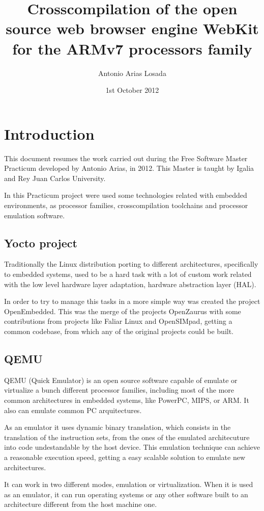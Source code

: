 \documentclass[a4paper,11pt,openany]{report}
\title{Crosscompilation of the open source web browser engine WebKit for the ARMv7 processors family}
\author{Antonio Arias Losada}
\date{1st October 2012}
\begin{document}
\maketitle
\tableofcontents
\listoffigures


\chapter{Introduction}
This document resumes the work carried out during the Free Software Master\cite{master} Practicum developed by Antonio Arias, in 2012. This Master is taught by Igalia and Rey Juan Carlos University.

In this Practicum project were used some technologies related with embedded environments, as processor families, crosscompilation toolchains and processor emulation software.

\section{Yocto project}
Traditionally the Linux distribution porting to different architectures, specifically to embedded systems, used to be a hard task with a lot of custom work related with the low level hardware layer adaptation, hardware abstraction layer (HAL).

In order to try to manage this tasks in a more simple way was created the project OpenEmbedded. This was  the merge of the projects OpenZaurus with some contributions from projects like Faliar Linux and OpenSIMpad, getting a common codebase, from which any of the original projects could be built.

\section{QEMU}
QEMU (Quick Emulator)\cite{qemu} is an open source software capable of emulate or virtualize a bunch different processor families, including most of the more common architectures in embedded systems, like PowerPC, MIPS, or ARM. It also can emulate common PC arquitectures.

As an emulator it uses dynamic binary translation, which consists in the translation of the instruction sets, from the ones of the emulated architecuture into code undestandable by the host device. This emulation technique can achieve a reasonable execution speed, getting a easy scalable solution to emulate new architectures.

It can work in two different modes, emulation or virtualization. When it is used as an emulator, it can run operating systems or any other software built to an architecture different from the host machine one.
\end{document}
